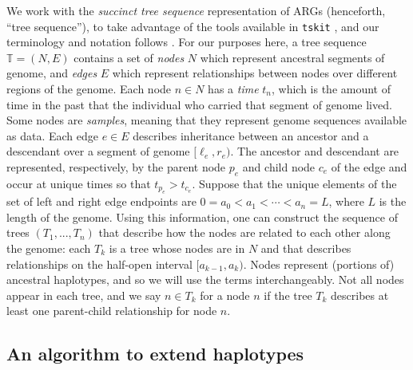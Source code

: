 \documentclass[10pt,twoside,lineno]{gsajnl}
\newcommand{\T}{\mathbb{T}}
\newcommand{\tskit}{\texttt{tskit}}
\begin{document}
We work with the \emph{succinct tree sequence} representation of ARGs (henceforth, ``tree sequence''),
to take advantage of the %
tools available in \tskit{} \citep{tskit}, 
and our terminology and notation follows \citet{ralph2020efficiently}.
For our purposes here,
a tree sequence $\T = (N, E)$ contains a set of \emph{nodes} $N$ 
which represent ancestral segments of genome,
and \emph{edges} $E$ which represent relationships between nodes over different regions of the genome.
Each node $n \in N$ has a \emph{time} $t_n$,
which is the amount of time in the past that the individual who carried that segment of genome lived. 
Some nodes are \emph{samples}, meaning that they represent genome sequences available as data.
Each edge $e \in E$ describes inheritance between an ancestor and a descendant
over a segment of genome $[\ell_e, r_e)$.
The ancestor and descendant are represented, respectively, by the parent node $p_e$ and child node $c_e$ of the edge and occur at unique times so that $t_{p_e} > t_{c_e}$. 
Suppose that the unique elements of the set of left and right edge endpoints
are $0 = a_0 < a_1 < \cdots < a_{n} = L$, where $L$ is the length of the genome.
Using this information, one can construct the sequence of 
trees $\left(T_1,...,T_{n}\right)$ that describe how the nodes are related to each other along the genome:
each $T_k$ is a tree whose nodes are in $N$
and that describes relationships on the half-open interval $[a_{k-1}, a_k)$.
Nodes represent (portions of) ancestral haplotypes, and so
we will use the terms interchangeably.
Not all nodes appear in each tree,
and we say $n \in T_k$ for a node $n$ if the tree $T_k$ describes at least one parent-child relationship
for node $n$.

\subsection{An algorithm to extend haplotypes}
\end{document}
